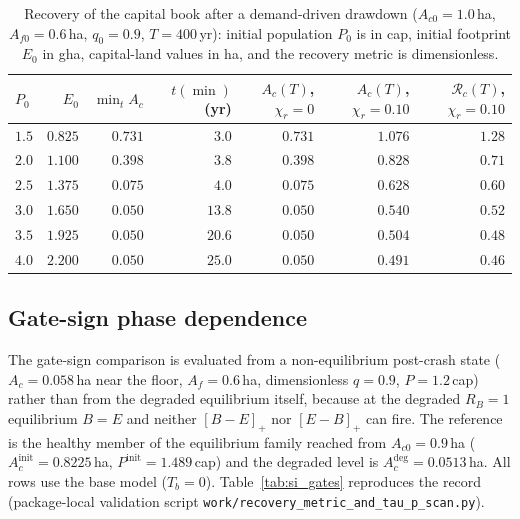 \documentclass[11pt,a4paper]{article}
\newcommand{\pos}[1]{\left[#1\right]_+}
\begin{document}
\begin{table}[htbp]
\centering\small
\caption{Recovery of the capital book after a demand-driven drawdown ($A_{c0}=1.0$\,ha, $A_{f0}=0.6$\,ha, $q_0=0.9$, $T=400$\,yr): initial population $P_0$ is in cap, initial footprint $E_0$ in gha, capital-land values in ha, and the recovery metric is dimensionless.}
\label{tab:si_recovery}
\begin{tabular}{l r r r r r r}
\toprule
$P_0$ & $E_0$ & $\min_tA_c$ & $t(\min)$ (yr) & $A_c(T)$, $\chi_r=0$ & $A_c(T)$, $\chi_r=0.10$ & $\mathcal R_c(T)$, $\chi_r=0.10$ \\
\midrule
$1.5$ & $0.825$ & $0.731$ & $3.0$ & $0.731$ & $1.076$ & $1.28$ \\
$2.0$ & $1.100$ & $0.398$ & $3.8$ & $0.398$ & $0.828$ & $0.71$ \\
$2.5$ & $1.375$ & $0.075$ & $4.0$ & $0.075$ & $0.628$ & $0.60$ \\
$3.0$ & $1.650$ & $0.050$ & $13.8$ & $0.050$ & $0.540$ & $0.52$ \\
$3.5$ & $1.925$ & $0.050$ & $20.6$ & $0.050$ & $0.504$ & $0.48$ \\
$4.0$ & $2.200$ & $0.050$ & $25.0$ & $0.050$ & $0.491$ & $0.46$ \\
\bottomrule
\end{tabular}
\end{table}

\subsection{Gate-sign phase dependence}\label{si:gates}

The gate-sign comparison is evaluated from a non-equilibrium post-crash state ($A_c=0.058$\,ha near the floor, $A_f=0.6$\,ha, dimensionless $q=0.9$, $P=1.2$\,cap) rather than from the degraded equilibrium itself, because at the degraded $R_B=1$ equilibrium $B=E$ and neither $\pos{B-E}$ nor $\pos{E-B}$ can fire. The reference is the healthy member of the equilibrium family reached from $A_{c0}=0.9$\,ha ($A_c^{\mathrm{init}}=0.8225$\,ha, $P^{\mathrm{init}}=1.489$\,cap) and the degraded level is $A_c^{\mathrm{deg}}=0.0513$\,ha. All rows use the base model ($T_b=0$). Table~\ref{tab:si_gates} reproduces the record (package-local validation script \texttt{work/recovery\_metric\_and\_tau\_p\_scan.py}).
\end{document}
